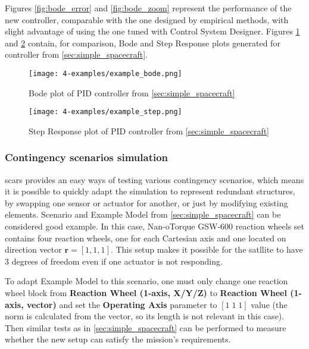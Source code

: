         Figures \ref{fig:bode_error} and \ref{fig:bode_zoom} represent the performance of the new controller, comparable with the one designed by empirical methods, with slight advantage of using the one tuned with Control System Designer. Figures \ref{fig:example_bode} and \ref{fig:example_step} contain, for comparison, Bode and Step Response plots generated for controller from \autoref{sec:simple_spacecraft}.

        \begin{figure}[H]
            \centering
            \texttt{[image: 4-examples/example\_bode.png]}
            \caption{Bode plot of PID controller from \autoref{sec:simple_spacecraft}}
            \label{fig:example_bode}
        \end{figure}

        \begin{figure}[H]
            \centering
            \texttt{[image: 4-examples/example\_step.png]}
            \caption{Step Response plot of PID controller from \autoref{sec:simple_spacecraft}}
            \label{fig:example_step}
        \end{figure}




        

    \subsubsection{Contingency scenarios simulation}
        \ac{scars} provides an easy ways of testing various contingency scenarios, which means it is possible to quickly adapt the simulation to represent redundant structures, by swapping one sensor or actuator for another, or just by modifying existing elements. Scenario and Example Model from \autoref{sec:simple_spacecraft} can be considered good example. In this case, Nan-oTorque GSW-600 reaction wheels set contains four reaction wheels, one for each Cartesian axis and one located on direction vector $\textbf{r} = [1, 1, 1]$. This setup makes it possible for the satllite to have 3 degrees of freedom even if one actuator is not responding.

        To adapt Example Model to this scenario, one must only change one reaction wheel block from \textbf{Reaction Wheel (1-axis, X/Y/Z)} to \textbf{Reaction Wheel (1-axis, vector)} and set the \textbf{Operating Axis} parameter to $[1\; 1\; 1]$ value (the norm is calculated from the vector, so its length is not relevant in this case). Then similar tests as in \autoref{sec:simple_spacecraft} can be performed to measure whether the new setup can satisfy the mission's requirements.
